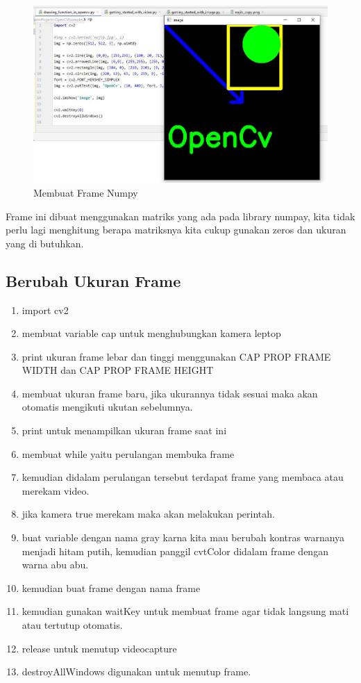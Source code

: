 \begin{figure}[ht]
\centering
\includegraphics[scale=0.5]{figures/2,15.jpg}
\caption{Membuat Frame Numpy}
\label{contoh}
\end{figure}

Frame ini dibuat menggunakan matriks yang ada pada library numpay, kita tidak perlu lagi menghitung berapa matriksnya kita cukup gunakan zeros dan ukuran yang di butuhkan.

\newpage
\subsection{Berubah Ukuran Frame}

\begin{enumerate}
	\item import cv2
	\item membuat variable cap untuk menghubungkan kamera leptop
	\item print ukuran frame lebar dan tinggi menggunakan CAP PROP FRAME WIDTH dan CAP PROP FRAME HEIGHT
	\item membuat ukuran frame baru, jika ukurannya tidak sesuai maka akan otomatis mengikuti ukutan sebelumnya.
	\item print untuk menampilkan ukuran frame saat ini
	\item membuat while yaitu perulangan membuka frame
	\item kemudian didalam perulangan tersebut terdapat frame yang membaca atau merekam video.
	\item jika kamera true merekam maka akan melakukan perintah. 
	\item buat variable dengan nama gray karna kita mau berubah kontras warnanya menjadi hitam putih, kemudian panggil cvtColor didalam frame dengan warna abu abu.
	\item kemudian buat frame dengan nama frame
	\item kemudian gunakan waitKey untuk membuat frame agar tidak langsung mati atau tertutup otomatis.
	\item release untuk menutup videocapture
	\item destroyAllWindows digunakan untuk menutup frame.
\end{enumerate}

